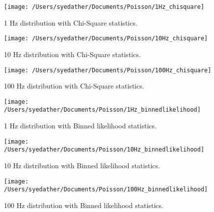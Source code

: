 \documentclass[10pt]{article}
\begin{document}
\begin{figure}
\begin{center}
\texttt{[image: /Users/syedather/Documents/Poisson/1Hz\_chisquare]}
\caption{\label{fig:sample}1 Hz distribution with Chi-Square statistics.}
\end{center}
\end{figure}

\begin{figure}
\begin{center}
\texttt{[image: /Users/syedather/Documents/Poisson/10Hz\_chisquare]}
\caption{\label{fig:sample}10 Hz distribution with Chi-Square statistics.}
\end{center}
\end{figure}

\begin{figure}
\begin{center}
\texttt{[image: /Users/syedather/Documents/Poisson/100Hz\_chisquare]}
\caption{\label{fig:sample}100 Hz distribution with Chi-Square statistics.}
\end{center}
\end{figure}

\begin{figure}
\begin{center}
\texttt{[image: /Users/syedather/Documents/Poisson/1Hz\_binnedlikelihood]}
\caption{\label{fig:sample}1 Hz distribution with Binned likelihood statistics.}
\end{center}
\end{figure}

\begin{figure}
\begin{center}
\texttt{[image: /Users/syedather/Documents/Poisson/10Hz\_binnedlikelihood]}
\caption{\label{fig:sample}10 Hz distribution with Binned likelihood statistics.}
\end{center}
\end{figure}

\begin{figure}
\begin{center}
\texttt{[image: /Users/syedather/Documents/Poisson/100Hz\_binnedlikelihood]}
\caption{\label{fig:sample}100 Hz distribution with Binned likelihood statistics.}
\end{center}
\end{figure}
\end{document}
